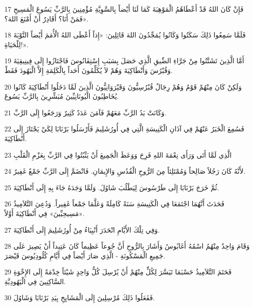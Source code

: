 \par 17 فَإِنْ كَانَ اللهُ قَدْ أَعْطَاهُمُ الْمَوْهِبَةَ كَمَا لَنَا أَيْضاً بِالسَّوِيَّةِ مُؤْمِنِينَ بِالرَّبِّ يَسُوعَ الْمَسِيحِ فَمَنْ أَنَا؟ أَقَادِرٌ أَنْ أَمْنَعَ اللهَ؟».
\par 18 فَلَمَّا سَمِعُوا ذَلِكَ سَكَتُوا وَكَانُوا يُمَجِّدُونَ اللهَ قَائِلِينَ: «إِذاً أَعْطَى اللهُ الْأُمَمَ أَيْضاً التَّوْبَةَ لِلْحَيَاةِ!».
\par 19 أَمَّا الَّذِينَ تَشَتَّتُوا مِنْ جَرَّاءِ الضِّيقِ الَّذِي حَصَلَ بِسَبَبِ إِسْتِفَانُوسَ فَاجْتَازُوا إِلَى فِينِيقِيَةَ وَقُبْرُسَ وَأَنْطَاكِيَةَ وَهُمْ لاَ يُكَلِّمُونَ أَحَداً بِالْكَلِمَةِ إِلاَّ الْيَهُودَ فَقَطْ.
\par 20 وَلَكِنْ كَانَ مِنْهُمْ قَوْمٌ وَهُمْ رِجَالٌ قُبْرُسِيُّونَ وَقَيْرَوَانِيُّونَ الَّذِينَ لَمَّا دَخَلُوا أَنْطَاكِيَةَ كَانُوا يُخَاطِبُونَ الْيُونَانِيِّينَ مُبَشِّرِينَ بِالرَّبِّ يَسُوعَ.
\par 21 وَكَانَتْ يَدُ الرَّبِّ مَعَهُمْ فَآمَنَ عَدَدٌ كَثِيرٌ وَرَجَعُوا إِلَى الرَّبِّ.
\par 22 فَسُمِعَ الْخَبَرُ عَنْهُمْ فِي آذَانِ الْكَنِيسَةِ الَّتِي فِي أُورُشَلِيمَ فَأَرْسَلُوا بَرْنَابَا لِكَيْ يَجْتَازَ إِلَى أَنْطَاكِيَةَ.
\par 23 الَّذِي لَمَّا أَتَى وَرَأَى نِعْمَةَ اللهِ فَرِحَ وَوَعَظَ الْجَمِيعَ أَنْ يَثْبُتُوا فِي الرَّبِّ بِعَزْمِ الْقَلْبِ
\par 24 لأَنَّهُ كَانَ رَجُلاً صَالِحاً وَمُمْتَلِئاً مِنَ الرُّوحِ الْقُدُسِ وَالإِيمَانِ. فَانْضَمَّ إِلَى الرَّبِّ جَمْعٌ غَفِيرٌ.
\par 25 ثُمَّ خَرَجَ بَرْنَابَا إِلَى طَرْسُوسَ لِيَطْلُبَ شَاوُلَ. وَلَمَّا وَجَدَهُ جَاءَ بِهِ إِلَى أَنْطَاكِيَةَ.
\par 26 فَحَدَثَ أَنَّهُمَا اجْتَمَعَا فِي الْكَنِيسَةِ سَنَةً كَامِلَةً وَعَلَّمَا جَمْعاً غَفِيراً. وَدُعِيَ التَّلاَمِيذُ «مَسِيحِيِّينَ» فِي أَنْطَاكِيَةَ أَوَّلاً.
\par 27 وَفِي تِلْكَ الأَيَّامِ انْحَدَرَ أَنْبِيَاءُ مِنْ أُورُشَلِيمَ إِلَى أَنْطَاكِيَةَ.
\par 28 وَقَامَ وَاحِدٌ مِنْهُمُ اسْمُهُ أَغَابُوسُ وَأَشَارَ بِالرُّوحِ أَنَّ جُوعاً عَظِيماً كَانَ عَتِيداً أَنْ يَصِيرَ عَلَى جَمِيعِ الْمَسْكُونَةِ - الَّذِي صَارَ أَيْضاً فِي أَيَّامِ كُلُودِيُوسَ قَيْصَرَ.
\par 29 فَحَتَمَ التَّلاَمِيذُ حَسْبَمَا تَيَسَّرَ لِكُلٍّ مِنْهُمْ أَنْ يُرْسِلَ كُلُّ وَاحِدٍ شَيْئاً خِدْمَةً إِلَى الإِخْوَةِ السَّاكِنِينَ فِي الْيَهُودِيَّةِ.
\par 30 فَفَعَلُوا ذَلِكَ مُرْسِلِينَ إِلَى الْمَشَايِخِ بِيَدِ بَرْنَابَا وَشَاوُلَ.

